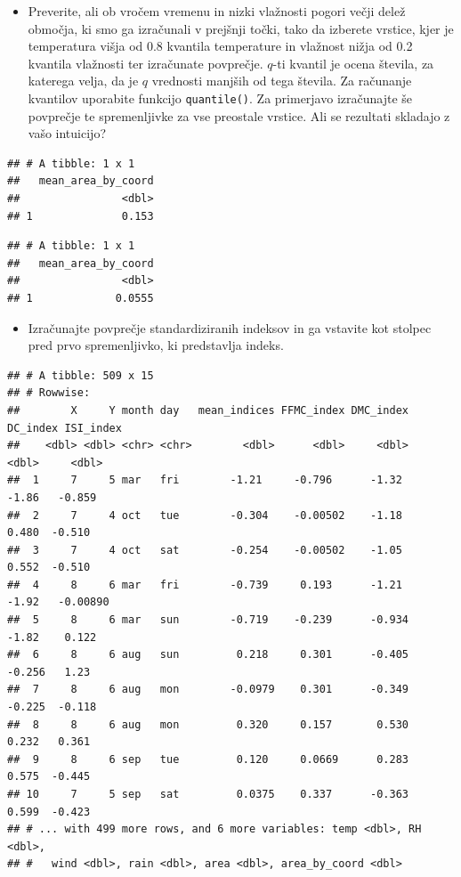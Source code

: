 \documentclass[
]{book}
\providecommand{\tightlist}{%
  \setlength{\itemsep}{0pt}\setlength{\parskip}{0pt}}
\begin{document}
\begin{enumerate}
  \begin{itemize}
  \tightlist
  \item
    Preverite, ali ob vročem vremenu in nizki vlažnosti pogori večji delež območja, ki smo ga izračunali v prejšnji točki, tako da izberete vrstice, kjer je temperatura višja od 0.8 kvantila temperature in vlažnost nižja od 0.2 kvantila vlažnosti ter izračunate povprečje. \(q\)-ti kvantil je ocena števila, za katerega velja, da je \(q\) vrednosti manjših od tega števila. Za računanje kvantilov uporabite funkcijo \texttt{quantile()}. Za primerjavo izračunajte še povprečje te spremenljivke za vse preostale vrstice. Ali se rezultati skladajo z vašo intuicijo?
  \end{itemize}

\begin{verbatim}
## # A tibble: 1 x 1
##   mean_area_by_coord
##                <dbl>
## 1              0.153
\end{verbatim}

\begin{verbatim}
## # A tibble: 1 x 1
##   mean_area_by_coord
##                <dbl>
## 1             0.0555
\end{verbatim}

  \begin{itemize}
  \tightlist
  \item
    Izračunajte povprečje standardiziranih indeksov in ga vstavite kot stolpec pred prvo spremenljivko, ki predstavlja indeks.
  \end{itemize}

\begin{verbatim}
## # A tibble: 509 x 15
## # Rowwise: 
##        X     Y month day   mean_indices FFMC_index DMC_index DC_index ISI_index
##    <dbl> <dbl> <chr> <chr>        <dbl>      <dbl>     <dbl>    <dbl>     <dbl>
##  1     7     5 mar   fri        -1.21     -0.796      -1.32    -1.86   -0.859  
##  2     7     4 oct   tue        -0.304    -0.00502    -1.18     0.480  -0.510  
##  3     7     4 oct   sat        -0.254    -0.00502    -1.05     0.552  -0.510  
##  4     8     6 mar   fri        -0.739     0.193      -1.21    -1.92   -0.00890
##  5     8     6 mar   sun        -0.719    -0.239      -0.934   -1.82    0.122  
##  6     8     6 aug   sun         0.218     0.301      -0.405   -0.256   1.23   
##  7     8     6 aug   mon        -0.0979    0.301      -0.349   -0.225  -0.118  
##  8     8     6 aug   mon         0.320     0.157       0.530    0.232   0.361  
##  9     8     6 sep   tue         0.120     0.0669      0.283    0.575  -0.445  
## 10     7     5 sep   sat         0.0375    0.337      -0.363    0.599  -0.423  
## # ... with 499 more rows, and 6 more variables: temp <dbl>, RH <dbl>,
## #   wind <dbl>, rain <dbl>, area <dbl>, area_by_coord <dbl>
\end{verbatim}
\end{enumerate}
\end{document}
